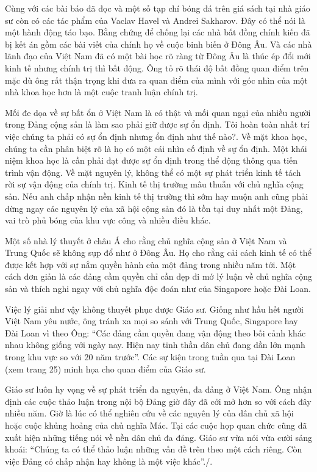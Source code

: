 Cùng với các bài báo đã đọc và một số tạp chí bóng đá trên giá sách tại nhà giáo sư còn có các tác phẩm của Vaclav Havel và Andrei Sakharov. Đây có thể nói là một hành động táo bạo. Bằng chứng để chống lại các nhà bất đồng chính kiến đã ​​bị kết án gồm các bài viết của chính họ về cuộc binh biến ở Đông Âu. Và các nhà lãnh đạo của Việt Nam đã có một bài học rõ ràng từ Đông Âu là thúc ép đổi mới kinh tế nhưng chính trị thì bất động. Ông tỏ rõ thái độ bất đồng quan điểm trên mặc dù ông rất thận trọng khi đưa ra quan điểm của mình với góc nhìn của một nhà khoa học hơn là một cuộc tranh luận chính trị.


Mối đe dọa về sự bất ổn ở Việt Nam là có thật và mối quan ngại của nhiều người trong Đảng cộng sản là làm sao phải giữ được sự ổn định. Tôi hoàn toàn nhất trí việc chúng ta phải có sự ổn định nhưng ổn định như thế nào?. Về mặt khoa học, chúng ta cần phân biệt rõ là họ có một cái nhìn cố định về sự ổn định. Một khái niệm khoa học là cần phải đạt được sự ổn định trong thể động thông qua tiến trình vận động. Về mặt nguyên lý, không thể có một sự phát triển kinh tế tách rời sự vận động của chính trị. Kinh tế thị trường mâu thuẫn với chủ nghĩa cộng sản. Nếu anh chấp nhận nền kinh tế thị trường thì sớm hay muộn anh cũng phải dừng ngay các nguyên lý của xã hội cộng sản đó là tồn tại duy nhất một Đảng, vai trò phủ bóng của khu vực công và nhiều điều khác. 


Một số nhà lý thuyết ở châu Á cho rằng chủ nghĩa cộng sản ở Việt Nam và Trung Quốc sẽ không sụp đổ như ở Đông Âu. Họ cho rằng cải cách kinh tế có thể được kết hợp với sự nắm quyền hành của một đảng trong nhiều năm tới. Một cách đơn giản là các đảng cầm quyền chỉ cần dẹp đi mớ lý luận về chủ nghĩa cộng sản và thích nghi ngay với chủ nghĩa độc đoán như của Singapore hoặc Đài Loan.


Việc lý giải như vậy không thuyết phục được Giáo sư. Giống như hầu hết người Việt Nam yêu nước, ông tránh xa mọi so sánh với Trung Quốc, Singapore hay Đài Loan vì theo Ông: “Các đảng cầm quyền đang vận động theo bối cảnh khác nhau không giống với ngày nay. Hiện nay tinh thần dân chủ đang dần lớn mạnh trong khu vực so với 20 năm trước”. Các sự kiện trong tuần qua tại Đài Loan (xem trang 25) minh họa cho quan điểm của Giáo sư.


Giáo sư luôn hy vọng về sự phát triển đa nguyên, đa đảng ở Việt Nam. Ông nhận định các cuộc thảo luận trong nội bộ Đảng giờ đây đã cởi mở hơn so với cách đây nhiều năm. Giờ là lúc có thể nghiên cứu về các nguyên lý của dân chủ xã hội hoặc cuộc khủng hoảng của chủ nghĩa Mác. Tại các cuộc họp quan chức cũng đã xuất hiện những tiếng nói về nền dân chủ đa đảng. Giáo sư vừa nói vừa cười sảng khoái: “Chúng ta có thể thảo luận những vấn đề trên theo một cách riêng. Còn việc Đảng có chấp nhận hay không là một việc khác”./. 
